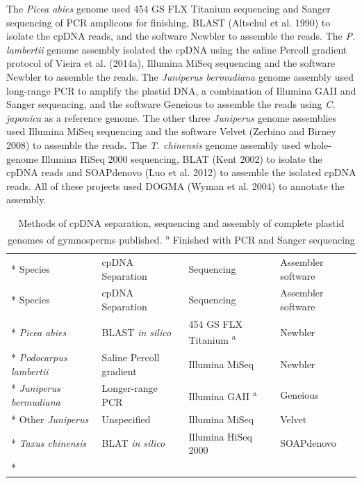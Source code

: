 \documentclass[
  12pt,
  oneside,
  openany]{book}
\begin{document}
The \emph{Picea abies} genome used 454 GS FLX Titanium sequencing and Sanger sequencing of PCR amplicons for finishing, BLAST (Altschul et al. 1990) to isolate the cpDNA reads, and the software Newbler to assemble the reads. The \emph{P. lambertii} genome assembly isolated the cpDNA using the saline Percoll gradient protocol of Vieira et al. (2014a), Illumina MiSeq sequencing and the software Newbler to assemble the reads. The \emph{Juniperus bermudiana} genome assembly used long-range PCR to amplify the plastid DNA, a combination of Illumina GAII and Sanger sequencing, and the software Geneious to assemble the reads using \emph{C. japonica} as a reference genome. The other three \emph{Juniperus} genome assemblies used Illumina MiSeq sequencing and the software Velvet (Zerbino and Birney 2008) to assemble the reads. The \emph{T. chinensis} genome assembly used whole-genome Illumina HiSeq 2000 sequencing, BLAT (Kent 2002) to isolate the cpDNA reads and SOAPdenovo (Luo et al. 2012) to assemble the isolated cpDNA reads. All of these projects used DOGMA (Wyman et al. 2004) to annotate the assembly.

\hypertarget{tbl:cpmethods}{}
\begin{singlespace}
\small
\begin{longtable}[]{@{}llll@{}}
\caption[Methods of cpDNA separation, sequencing and assembly of complete plastid genomes of gymnosperms published.]{\label{tbl:cpmethods}Methods of cpDNA separation, sequencing and assembly of complete plastid genomes of gymnosperms published. \textsuperscript{a} Finished with PCR and Sanger sequencing}\tabularnewline*
\toprule
Species & cpDNA Separation & Sequencing & Assembler software\tabularnewline*
\midrule
\endfirsthead
\toprule
Species & cpDNA Separation & Sequencing & Assembler software\tabularnewline*
\midrule
\endhead
\emph{Picea abies} & BLAST \emph{in silico} & 454 GS FLX Titanium \textsuperscript{a} & Newbler\tabularnewline*
\emph{Podocarpus lambertii} & Saline Percoll gradient & Illumina MiSeq & Newbler\tabularnewline*
\emph{Juniperus bermudiana} & Longer-range PCR & Illumina GAII \textsuperscript{a} & Geneious\tabularnewline*
Other \emph{Juniperus} & Unspecified & Illumina MiSeq & Velvet\tabularnewline*
\emph{Taxus chinensis} & BLAT \emph{in silico} & Illumina HiSeq 2000 & SOAPdenovo\tabularnewline*
\bottomrule
\end{longtable}
\end{singlespace}
\end{document}
